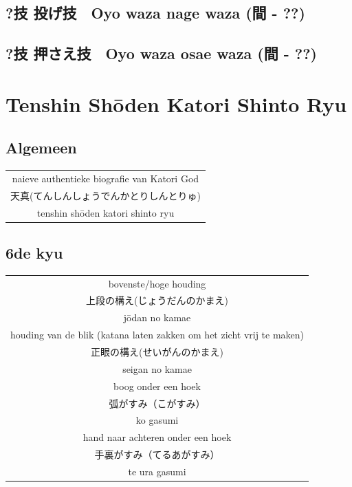 \documentclass[12pt]{scrartcl}
\begin{document}
\begin{CJK*}{UTF8}{min}
\subsection{?技 投げ技　Oyo waza nage waza (間 - ??)}

\subsection{?技 押さえ技　Oyo waza osae waza (間 - ??)}

\newpage
\section{Tenshin Sh\={o}den Katori Shinto Ryu}
\subsection{Algemeen}
\begin{table}[H]
\begin{center}
\begin{tabular}{c}
naieve authentieke biografie van Katori God\\
天真(てんしんしょうでんかとりしんとりゅ)\\
tenshin sh\={o}den katori shinto ryu
\end{tabular}
\end{center}
\label{katori}
\end{table}


\subsection{6de kyu}
\begin{table}[H]
\begin{center}
\begin{tabular}{c}
bovenste/hoge houding\\
上段の構え(じょうだんのかまえ)\\
j\={o}dan no kamae\\
\hline
houding van de blik (katana laten zakken om het zicht vrij te maken)\\
正眼の構え(せいがんのかまえ)\\
seigan no kamae\\
\hline
boog onder een hoek\\
弧がすみ（こがすみ）\\
ko gasumi\\
\hline
hand naar achteren onder een hoek\\
手裏がすみ（てるあがすみ）\\
te ura gasumi
\end{tabular}
\end{center}
\label{kyu_1_katori}
\end{table}

\end{CJK*}
\end{document}

